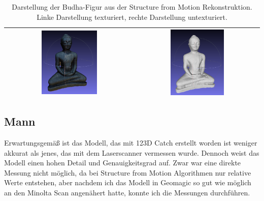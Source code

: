 \documentclass[]{article}
\begin{document}
\begin{table}[h]
\begin{center}
\begin{tabular}{| c | c |}
			\includegraphics[width=0.45\textwidth]{./Images/Budha/Budha_SfM_Textured_2.png} & \includegraphics[width=0.45\textwidth]{./Images/Budha/Budha_SfM_Untextured_2.png} \\
			\hline					  
		\end{tabular}
	\end{center}
	\caption{Darstellung der Budha-Figur aus der Structure from Motion Rekonstruktion. Linke Darstellung texturiert, rechte Darstellung untexturiert.}
	\label{tab:Budha-SfM}
\end{table}

\subsection{Mann}
Erwartungsgemäß ist das Modell, das mit 123D Catch erstellt worden ist weniger akkurat als jenes, das mit dem Laserscanner vermessen wurde. Dennoch weist das Modell einen hohen Detail und Genauigkeitsgrad auf. Zwar war eine direkte Messung nicht möglich, da bei Structure from Motion Algorithmen nur relative Werte entstehen, aber nachdem ich das Modell in Geomagic so gut wie möglich an den Minolta Scan angenähert hatte, konnte ich die Messungen durchführen.
\end{document}
